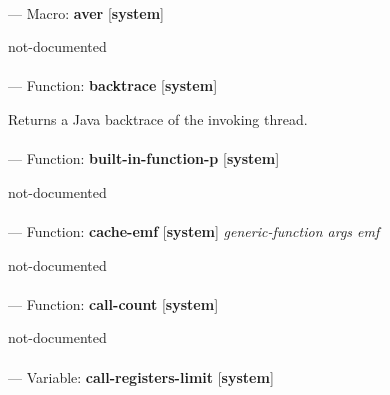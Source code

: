 \paragraph{}
\label{SYSTEM:AVER}
--- Macro: \textbf{aver} [\textbf{system}] \textit{}

\begin{adjustwidth}{5em}{5em}
not-documented
\end{adjustwidth}

\paragraph{}
\label{SYSTEM:BACKTRACE}
--- Function: \textbf{backtrace} [\textbf{system}] \textit{}

\begin{adjustwidth}{5em}{5em}
Returns a Java backtrace of the invoking thread.
\end{adjustwidth}

\paragraph{}
\label{SYSTEM:BUILT-IN-FUNCTION-P}
--- Function: \textbf{built-in-function-p} [\textbf{system}] \textit{}

\begin{adjustwidth}{5em}{5em}
not-documented
\end{adjustwidth}

\paragraph{}
\label{SYSTEM:CACHE-EMF}
--- Function: \textbf{cache-emf} [\textbf{system}] \textit{generic-function args emf}

\begin{adjustwidth}{5em}{5em}
not-documented
\end{adjustwidth}

\paragraph{}
\label{SYSTEM:CALL-COUNT}
--- Function: \textbf{call-count} [\textbf{system}] \textit{}

\begin{adjustwidth}{5em}{5em}
not-documented
\end{adjustwidth}

\paragraph{}
\label{SYSTEM:CALL-REGISTERS-LIMIT}
--- Variable: \textbf{call-registers-limit} [\textbf{system}] \textit{}

